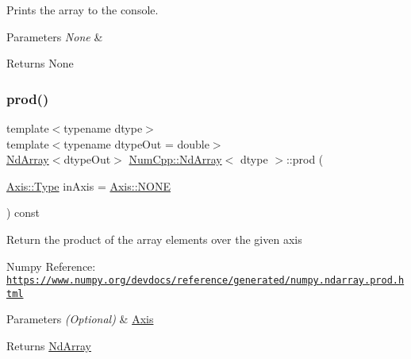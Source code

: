 Prints the array to the console.


\begin{DoxyParams}{Parameters}
{\em None} & \\
\hline
\end{DoxyParams}
\begin{DoxyReturn}{Returns}
None 
\end{DoxyReturn}
\mbox{\label{class_num_cpp_1_1_nd_array_a371f65dfdd0e8b1bf1bdb0a66b5720a6}} 
\subsubsection{\texorpdfstring{prod()}{prod()}}
{\footnotesize\ttfamily template$<$typename dtype$>$ \\
template$<$typename dtype\+Out  = double$>$ \\
\mbox{\hyperlink{class_num_cpp_1_1_nd_array}{Nd\+Array}}$<$dtype\+Out$>$ \mbox{\hyperlink{class_num_cpp_1_1_nd_array}{Num\+Cpp\+::\+Nd\+Array}}$<$ dtype $>$\+::prod (\begin{DoxyParamCaption}\item[{\mbox{\hyperlink{struct_num_cpp_1_1_axis_ac10eb76f8631762d9ed70c40c42ca6cb}{Axis\+::\+Type}}}]{in\+Axis = {\ttfamily \mbox{\hyperlink{struct_num_cpp_1_1_axis_ac10eb76f8631762d9ed70c40c42ca6cba747ae657022cca1d87702b56d0c038e9}{Axis\+::\+N\+O\+NE}}} }\end{DoxyParamCaption}) const\hspace{0.3cm}{\ttfamily [inline]}}

Return the product of the array elements over the given axis

Numpy Reference\+: \href{https://www.numpy.org/devdocs/reference/generated/numpy.ndarray.prod.html}{\tt https\+://www.\+numpy.\+org/devdocs/reference/generated/numpy.\+ndarray.\+prod.\+html}


\begin{DoxyParams}{Parameters}
{\em (\+Optional)} & \mbox{\hyperlink{struct_num_cpp_1_1_axis}{Axis}} \\
\hline
\end{DoxyParams}
\begin{DoxyReturn}{Returns}
\mbox{\hyperlink{class_num_cpp_1_1_nd_array}{Nd\+Array}} 
\end{DoxyReturn}
\mbox{\label{class_num_cpp_1_1_nd_array_acda9fe6d992152beb3748140bfc29da8}} 
